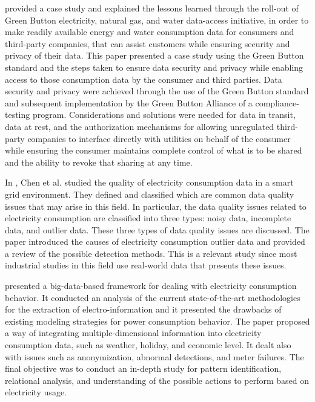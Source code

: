 \cite{Nguyen2019} provided a case study and explained the lessons learned through the roll-out of Green Button electricity, natural gas, and water data-access initiative, in order to make readily available energy and water consumption data for consumers and third-party companies, that can assist customers while ensuring security and privacy of their data.
This paper presented a case study using the Green Button standard and the steps taken to ensure data security and privacy while enabling access to those consumption data by the consumer and third parties.
Data security and privacy were achieved through the use of the Green Button standard and subsequent implementation by the Green Button Alliance of a compliance-testing program.
Considerations and solutions were needed for data in transit, data at rest, and the authorization mechanisms for allowing unregulated third-party companies to interface directly with utilities on behalf of the consumer while ensuring the consumer maintains complete control of what is to be shared and the ability to revoke that sharing at any time.

In \cite{CHEN201798},  Chen et al. studied the quality of electricity consumption data in a smart grid environment.
They defined and classified which are common data quality issues that may arise in this field.
In particular, the data quality issues related to electricity consumption are classified into three types: noisy data, incomplete data, and outlier data.
These three types of data quality issues are discussed.
The paper introduced the causes of electricity consumption outlier data and provided a review of the possible detection methods.
This is a relevant study since most industrial studies in this field use real-world data that presents these issues.

\cite{8577770} presented a big-data-based framework for dealing with electricity consumption behavior.
It conducted an analysis of the current state-of-the-art methodologies for the extraction of electro-information and it presented the drawbacks of existing modeling strategies for power consumption behavior.
The paper proposed a way of integrating multiple-dimensional information into electricity consumption data, such as weather, holiday, and economic level.
It dealt also with issues such as anonymization, abnormal detections, and meter failures.
The final objective was to conduct an in-depth study for pattern identification, relational analysis, and understanding of the possible actions to perform based on electricity usage.


